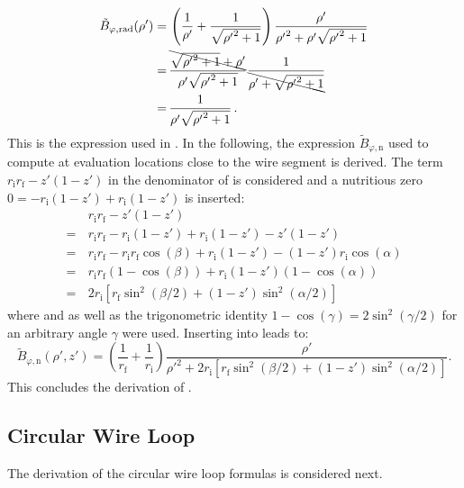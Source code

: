 \begin{align}
  \tilde{B}_{\varphi,\mathrm{rad}}(\rho')
  =&\, \left(\frac{1}{\rho'} + \frac{1}{\sqrt{{\rho'}^2+1}} \right)
       \frac{\rho'}{ {\rho'}^2 + \rho' \sqrt{{\rho'}^2+1} } \nonumber \\
  =&\, \frac{\bcancel{\sqrt{{\rho'}^2+1} + \rho'}}{\rho' \sqrt{{\rho'}^2+1}}
       \frac{1}{\bcancel{\rho' + \sqrt{{\rho'}^2+1} } }  \nonumber \\
  =&\, \frac{1}{\rho' \sqrt{{\rho'}^2+1}} \label{eqn:sws_B_phi_rad_derivation} \, .
\end{align}
This is the expression used in .
In the following, the expression $\tilde{B}_{\varphi,\mathrm{n}}$ used to compute
at evaluation locations close to the wire segment is derived.
The term $r_\mathrm{i} r_\mathrm{f} - z' (1 - z')$ in the denominator of 
is considered and a nutritious zero $0 = -r_\mathrm{i}(1 - z') + r_\mathrm{i}(1 - z')$ is inserted:
\begin{align}
  ~&\, r_\mathrm{i} r_\mathrm{f} - z' (1 - z') \nonumber \\
  =&\, r_\mathrm{i} r_\mathrm{f} - r_\mathrm{i}(1 - z') + r_\mathrm{i}(1 - z') - z' (1 - z') \nonumber \\
  =&\, r_\mathrm{i} r_\mathrm{f} - r_\mathrm{i} r_\mathrm{f} \cos(\beta) + r_\mathrm{i} (1 - z') - (1 - z') r_\mathrm{i} \cos(\alpha) \nonumber \\
  =&\, r_\mathrm{i} r_\mathrm{f} \left( 1 - \cos(\beta) \right) + r_\mathrm{i} (1 - z') \left(1 - \cos(\alpha) \right) \nonumber \\
  =&\, 2 r_\mathrm{i} \left[ r_\mathrm{f} \sin^2(\beta/2) + (1 - z') \sin^2(\alpha/2) \right] \label{eqn:denom_sws_B_phi}
\end{align}
where  and 
as well as the trigonometric identity $1 - \cos(\gamma) = 2 \sin^2(\gamma/2)$ for an arbitrary angle $\gamma$ were used.
Inserting  into  leads to:
\begin{equation}
  \tilde{B}_{\varphi,\mathrm{n}} (\rho', z')
  = \left(\frac{1}{r_\mathrm{f}} + \frac{1}{r_\mathrm{i}} \right)
    \frac{\rho'}
         {{\rho'}^2 + 2 r_\mathrm{i} \left[ r_\mathrm{f} \sin^2(\beta/2) + (1 - z') \sin^2(\alpha/2) \right]} \label{eqn:sws_B_phi_n_derivation}.
\end{equation}
This concludes the derivation of .

\subsection{Circular Wire Loop}
The derivation of the circular wire loop formulas is considered next.

